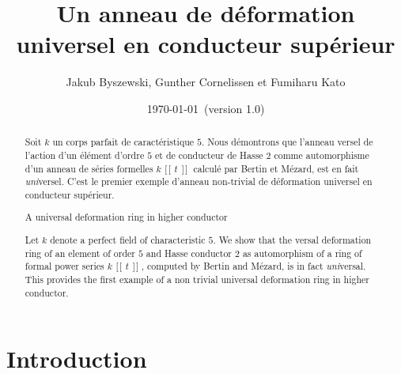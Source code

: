 \documentclass[11pt]{amsart}
\DeclareMathOperator{\psl}{\![\![\!}
\DeclareMathOperator{\psr}{\!]\!]}
\begin{document}
\date{\today\ (version 1.0)} 
\title[Un anneau de d\'eformation universel en conducteur sup\'erieur]{Un anneau de d\'eformation universel en conducteur sup\'erieur 
}

\author[J.~Byszewski, G.~Cornelissen, F.~Kato]{Jakub Byszewski, Gunther Cornelissen et Fumiharu Kato}
\address{Mathematisch Instituut, Universiteit Utrecht, Postbus 80.010, 3508 TA Utrecht, Nederland}
\address{Mathematisch Instituut, Universiteit Utrecht, Postbus 80.010, 3508 TA Utrecht, Nederland}
\address{Department of Mathematics,  Faculty of Sciences, University of Kyoto, Kyoto 606-8502, Japan}
\subjclass[2000]{}


\begin{abstract} 
\noindent Soit $k$ un corps parfait de caract\'eristique $5$. Nous d\'emontrons que l'anneau versel de l'action d'un \'el\'ement d'ordre $5$ et de conducteur de Hasse $2$ comme automorphisme d'un anneau de s\'eries formelles $k\psl t \psr$ calcul\'e par Bertin et M\'ezard, est en fait \emph{uni}versel. C'est le premier exemple d'anneau non-trivial de d\'eformation universel  en conducteur sup\'erieur. 

\medskip 

\begin{center} {\large A universal deformation ring in higher conductor} \end{center}

\medskip 

 Let $k$ denote a perfect field of characteristic $5$. We show that the versal deformation ring of an element of order $5$ and Hasse conductor $2$ as automorphism of a ring of formal power series $k\psl t \psr$, computed by Bertin and M\'ezard, is in fact \emph{uni}versal. This provides the first example of a non trivial universal deformation ring in higher conductor. 

 \end{abstract}

\maketitle


\section{Introduction} 
\end{document}
